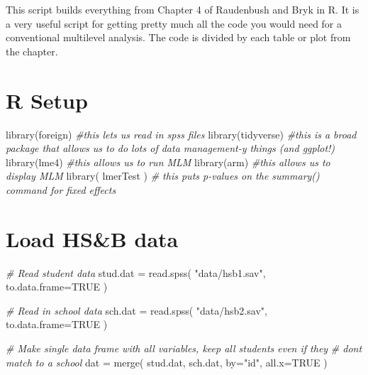 \documentclass[
  letterpaper,
  DIV=11,
  numbers=noendperiod]{scrreprt}
\newenvironment{Shaded}{\begin{snugshade}}{\end{snugshade}}
\newcommand{\AttributeTok}[1]{\textcolor[rgb]{0.49,0.56,0.16}{#1}}
\newcommand{\CommentTok}[1]{\textcolor[rgb]{0.38,0.63,0.69}{\textit{#1}}}
\newcommand{\ConstantTok}[1]{\textcolor[rgb]{0.53,0.00,0.00}{#1}}
\newcommand{\FunctionTok}[1]{\textcolor[rgb]{0.02,0.16,0.49}{#1}}
\newcommand{\NormalTok}[1]{\textcolor[rgb]{0.00,0.44,0.13}{#1}}
\newcommand{\OtherTok}[1]{\textcolor[rgb]{0.00,0.44,0.13}{#1}}
\newcommand{\StringTok}[1]{\textcolor[rgb]{0.25,0.44,0.63}{#1}}
\begin{document}
This script builds everything from Chapter 4 of Raudenbush and Bryk in
R. It is a very useful script for getting pretty much all the code you
would need for a conventional multilevel analysis. The code is divided
by each table or plot from the chapter.

\hypertarget{r-setup-2}{%
\section{R Setup}\label{r-setup-2}}

\begin{Shaded}
\begin{Highlighting}[]
\FunctionTok{library}\NormalTok{(foreign) }\CommentTok{\#this lets us read in spss files}
\FunctionTok{library}\NormalTok{(tidyverse) }\CommentTok{\#this is a broad package that allows us to do lots of data management{-}y things (and ggplot!)}
\FunctionTok{library}\NormalTok{(lme4) }\CommentTok{\#this allows us to run MLM}
\FunctionTok{library}\NormalTok{(arm) }\CommentTok{\#this allows us to display MLM}
\FunctionTok{library}\NormalTok{( lmerTest ) }\CommentTok{\# this puts p{-}values on the summary() command for fixed effects}
\end{Highlighting}
\end{Shaded}

\hypertarget{load-hsb-data}{%
\section{Load HS\&B data}\label{load-hsb-data}}

\begin{Shaded}
\begin{Highlighting}[]
\CommentTok{\# Read student data}
\NormalTok{stud.dat }\OtherTok{=} \FunctionTok{read.spss}\NormalTok{( }\StringTok{"data/hsb1.sav"}\NormalTok{, }\AttributeTok{to.data.frame=}\ConstantTok{TRUE}\NormalTok{ )}

\CommentTok{\# Read in school data}
\NormalTok{sch.dat }\OtherTok{=} \FunctionTok{read.spss}\NormalTok{( }\StringTok{"data/hsb2.sav"}\NormalTok{, }\AttributeTok{to.data.frame=}\ConstantTok{TRUE}\NormalTok{ )}

\CommentTok{\# Make single data frame with all variables, keep all students even if they}
\CommentTok{\# don\textquotesingle{}t match to a school}
\NormalTok{dat }\OtherTok{=} \FunctionTok{merge}\NormalTok{( stud.dat, sch.dat, }\AttributeTok{by=}\StringTok{"id"}\NormalTok{, }\AttributeTok{all.x=}\ConstantTok{TRUE}\NormalTok{ )}
\end{Highlighting}
\end{Shaded}
\end{document}
